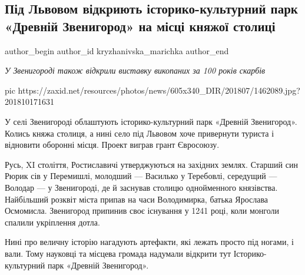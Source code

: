  
 
 
 
 
 
\subsection{Під Львовом відкриють історико-культурний парк «Древній Звенигород» на місці княжої столиці}
\label{sec:23_07_2018.news.ua.zaxid_net.kryzhanivska_marichka.1.zvenygorod}
\ifcmt
	author_begin
   author_id kryzhanivska_marichka
	author_end
\fi


\emph{У Звенигороді також відкрили виставку викопаних за 100 років скарбів}

\ifcmt
pic https://zaxid.net/resources/photos/news/605x340_DIR/201807/1462089.jpg?201810171631
\fi

У селі Звенигороді облаштують історико-культурний парк «Древній Звенигород».
Колись княжа столиця, а нині село під Львовом хоче привернути туриста і
відновити оборонні місця. Проект виграв грант Євросоюзу.

Русь, XI століття, Ростиславичі утверджуються на західних землях. Старший син
Рюрик сів у Перемишлі, молодший — Василько у Теребовлі, середущий — Володар — у
Звенигороді, де й заснував столицю однойменного князівства. Найбільший розквіт
міста припав на часи Володимирка, батька Ярослава Осмомисла. Звенигород
припинив своє існування у 1241 році, коли монголи спалили укріплення дотла.

Нині про величну історію нагадують артефакти, які лежать просто під ногами, і
вали. Тому науковці та місцева громада надумали відкрити тут
Історико-культурний парк «Древній Звенигород».

